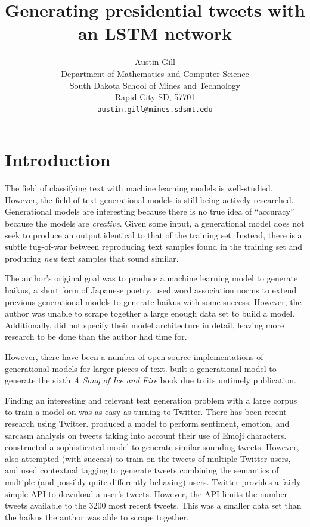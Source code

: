 \documentclass[letterpaper]{article}
\title{Generating presidential tweets with an LSTM network}
\author{%
    Austin Gill\\
    Department of Mathematics and Computer Science\\
    South Dakota School of Mines and Technology\\
    Rapid City SD, 57701\\
    \texttt{\href{mailto:austin.gill@mines.sdsmt.edu}{austin.gill@mines.sdsmt.edu}}\\
}
\begin{document}
\maketitle

\begin{abstract}
\end{abstract}

\section{Introduction}
    The field of classifying text with machine learning models is well-studied. However, the field of text-generational models is still being actively researched. Generational models are interesting because there is no true idea of ``accuracy'' because the models are \textit{creative}. Given some input, a generational model does not seek to produce an output identical to that of the training set. Instead, there is a subtle tug-of-war between reproducing text samples found in the training set and producing \textit{new} text samples that sound similar.

    The author's original goal was to produce a machine learning model to generate haikus, a short form of Japanese poetry. \citet{yael_2010} used word association norms to extend previous generational models to generate haikus with some success. However, the author was unable to scrape together a large enough data set to build a model. Additionally, \citet{yael_2010} did not specify their model architecture in detail, leaving more research to be done than the author had time for.

    However, there have been a number of open source implementations of generational models for larger pieces of text. \citet{thoutt_2017} built a generational model to generate the sixth \textit{A Song of Ice and Fire} \citep{martin} book due to its untimely publication.

    Finding an interesting and relevant text generation problem with a large corpus to train a model on was as easy as turning to Twitter. There has been recent research using Twitter. \citet{felbo_2017} produced a model to perform sentiment, emotion, and sarcasm analysis on tweets taking into account their use of Emoji characters. \citet{woolf_2017} constructed a sophisticated model to generate similar-sounding tweets. However, \citet{woolf_2017} also attempted (with success) to train on the tweets of multiple Twitter users, and used contextual tagging to generate tweets combining the semantics of multiple (and possibly quite differently behaving) users. Twitter provides a fairly simple API to download a user's tweets. However, the API limits the number tweets available to the 3200 most recent tweets. This was a smaller data set than the haikus the author was able to scrape together.
\end{document}
